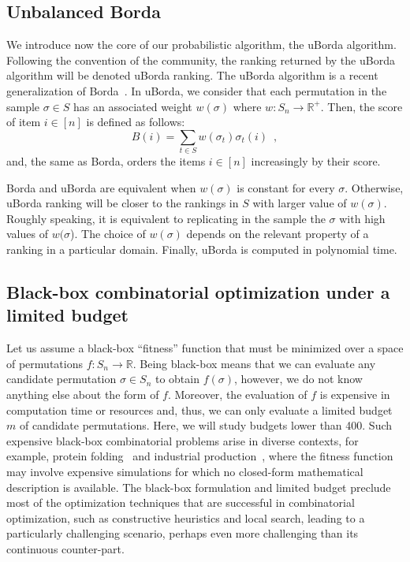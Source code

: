 \documentclass[sigconf,dvipsnames]{acmart}
\newcommand{\FEmax}{\ensuremath{m}}
\begin{document}
\subsection{Unbalanced Borda}\label{sec:uborda}
We introduce now the core of our probabilistic algorithm, the uBorda algorithm. Following the convention of the community, the ranking returned by the uBorda algorithm will be denoted uBorda ranking. The uBorda algorithm is a recent generalization of Borda~\cite{IruLobPer2020arxiv}. In uBorda, we consider that each permutation in the sample $\sigma\in S$ has an associated weight $w(\sigma)$ where $w\colon S_n \to \mathbb{R^{+}}$. Then, the score of item $i \in [n]$ is defined as follows:
%
\begin{equation}\label{eq:uborda_score}
B(i) =  \sum_{t\in S}  w(\sigma_t) \sigma_t(i) \enspace,
\end{equation}
%
and, the same as Borda, orders the items $i \in [n]$ increasingly by their score.

Borda and uBorda are equivalent when $w(\sigma)$ is constant for every $\sigma$. Otherwise, uBorda ranking will be closer to the rankings in $S$ with larger value of $w(\sigma)$. Roughly speaking, it is equivalent to replicating in the sample the $\sigma$ with high values of $w(\sigma$).
The choice of  $w(\sigma)$ depends on the relevant property of a ranking in a particular domain.
Finally, uBorda is computed in polynomial time.



\subsection{Black-box combinatorial optimization under a limited budget}

Let us assume a black-box ``fitness'' function that must be minimized over a
space of permutations $f\colon S_n \to \mathbb{R}$. Being black-box means that
we can evaluate any candidate permutation $\sigma \in S_n$ to obtain
$f(\sigma)$, however, we do not know anything else about the form of
$f$. Moreover, the evaluation of $f$ is expensive in computation time or
resources and, thus, we can only evaluate a limited budget $\FEmax$ of candidate
permutations. Here, we will study budgets lower than 400. Such expensive
black-box combinatorial problems arise in diverse contexts, for example,
protein folding~\citep{RomKraArn2012protein} and industrial
production~\citep{FerAlvDiaIglEna2014ants}, where the fitness function may
involve expensive simulations for which no closed-form mathematical description
is available. The black-box formulation and limited budget preclude most of the
optimization techniques that are successful in combinatorial optimization, such
as constructive heuristics and local search, leading to
a particularly challenging scenario, perhaps even more challenging than its continuous
counter-part.
\end{document}
